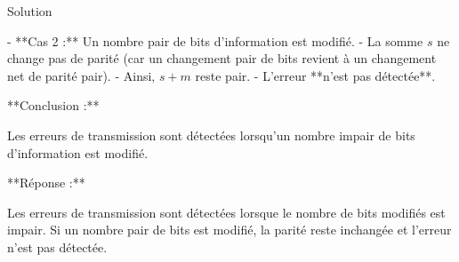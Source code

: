 \documentclass[a4paper,12pt]{article}
\begin{document}
\begin{solutionbox}{Solution}
\begin{enumerate}
    - **Cas 2 :** Un nombre pair de bits d’information est modifié.
      - La somme \( s \) ne change pas de parité (car un changement pair de bits revient à un changement net de parité pair).
      - Ainsi, \( s + m \) reste pair.
      - L’erreur **n’est pas détectée**.
    
    **Conclusion :**
    
    Les erreurs de transmission sont détectées lorsqu'un nombre impair de bits d’information est modifié.
    
    **Réponse :**
    
    Les erreurs de transmission sont détectées lorsque le nombre de bits modifiés est impair. Si un nombre pair de bits est modifié, la parité reste inchangée et l’erreur n’est pas détectée.
\end{enumerate}
\end{solutionbox}
\end{document}
